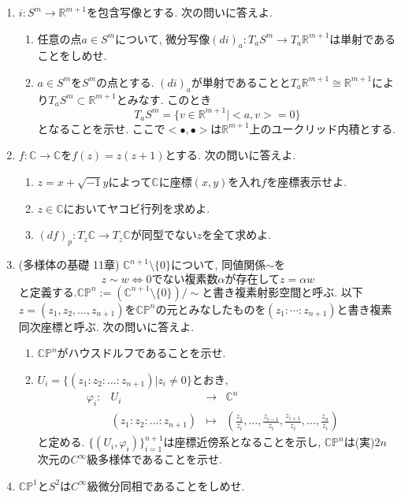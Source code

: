 \documentclass[dvipdfmx,a4paper,11pt]{article}
\newcommand{\R}{\mathbb{R}}
\newcommand{\C}{\mathbb{C}}
\theoremstyle{definition}
\begin{document}
\begin{enumerate}[label=\textbf{問}1.\arabic*]
\item $i : S^{m} \rightarrow \R^{m+1} $を包含写像とする. 次の問いに答えよ.
\begin{enumerate}
	\item 任意の点$a \in S^{m}$について, 微分写像$(di)_{a} : T_{a}S^{m} \rightarrow T_{a}\R^{m+1}$は単射であることをしめせ.
	\item $a \in S^{m}$を$S^{m}$の点とする. $(di)_{a} $が単射であることと$T_{a}\R^{m+1} \cong \R^{m+1}$により$T_{a}S^{m}  \subset \R^{m+1} $とみなす. 
	このとき
	$$
	T_{a}S^{m} = \{ v \in \R^{m+1} | <a,v> = 0\}
	$$
	となることを示せ. ここで$<\bullet, \bullet>$は$ \R^{m+1}$上のユークリッド内積とする. 
\end{enumerate}
 
\newpage 
\item $f : \C \rightarrow \C$を$f(z) = z(z+1)$とする. 次の問いに答えよ.
	\begin{enumerate}
	\item $z = x + \sqrt{-1} y$によって$\C$に座標$(x,y)$を入れ$f$を座標表示せよ.
	\item $z \in \C$においてヤコビ行列を求めよ.
	\item $(df)_{p} : T_{z}\C \rightarrow T_{z}\C$が同型でない$z$を全て求めよ.
	\end{enumerate}


\item (多様体の基礎 11章) $\C^{n+1} \setminus \{ 0\}$について, 同値関係$\sim$を
	$$
	z \sim w \Leftrightarrow \text{0でない複素数$\alpha$が存在して$z = \alpha w$}
	$$
	と定義する.$ \C\mathbb{P}^{n}:= (\C^{n+1} \setminus \{ 0\})/\sim$と書き複素射影空間と呼ぶ. 以下$z = (z_{1}, z_{2}, \ldots, z_{n+1})$を$\C\mathbb{P}^{n}$の元とみなしたものを$(z_{1}: \cdots : z_{n+1})$と書き複素同次座標と呼ぶ.
	次の問いに答えよ.
	\begin{enumerate}
	\item $\C\mathbb{P}^{n}$がハウスドルフであることを示せ.
	\item $U_{i} = \{ (z_{1}:z_{2}: \ldots : z_{n+1}) | z_{i}\neq 0\}$とおき, 
$$
\begin{array}{ccccc}
\varphi_{i}: &U_{i}& \rightarrow & \C^{n} & \\
&(z_{1}:z_{2}: \ldots : z_{n+1})& \longmapsto &(\frac{z_1}{z_i}, \ldots, \frac{z_{i-1}}{z_i}, \frac{z_{i+1}}{z_i}, \ldots, \frac{z_n}{z_i})&
\end{array}
$$	
と定める. $\{ (U_i , \varphi_{i})\}_{i=1}^{n+1}$は座標近傍系となることを示し, $\C\mathbb{P}^{n}$は(実)$2n$次元の$C^{\infty}$級多様体であることを示せ. 
	\end{enumerate}
\item %
$\C\mathbb{P}^{1}$と$S^2$は$C^{\infty}$級微分同相であることをしめせ. 


\end{enumerate}
\end{document}
